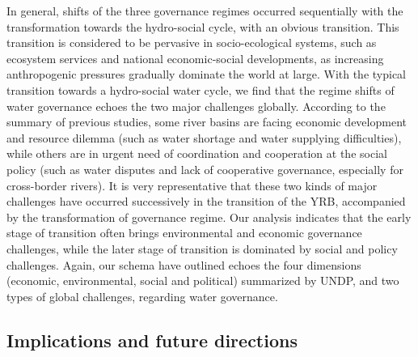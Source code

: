 \documentclass[9pt, twocolumn, twoside, lineno]{pnas-new}
\begin{document}
In general, shifts of the three governance regimes occurred sequentially with the transformation towards the hydro-social cycle, with an obvious transition.
This transition is considered to be pervasive in socio-ecological systems, such as ecosystem services and national economic-social developments, as increasing anthropogenic pressures gradually dominate the world at large.
With the typical transition towards a hydro-social water cycle, we find that the regime shifts of water governance echoes the two major challenges globally.
According to the summary of previous studies, some river basins are facing economic development and resource dilemma (such as water shortage and water supplying difficulties), while others are in urgent need of coordination and cooperation at the social policy (such as water disputes and lack of cooperative governance, especially for cross-border rivers).
It is very representative that these two kinds of major challenges have occurred successively in the transition of the YRB, accompanied by the transformation of governance regime.
Our analysis indicates that the early stage of transition often brings environmental and economic governance challenges, while the later stage of transition is dominated by social and policy challenges.
Again, our schema have outlined echoes the four dimensions (economic, environmental, social and political) summarized by UNDP, and two types of global challenges, regarding water governance. 


\subsection*{Implications and future directions}
\label{Outlook}
\end{document}

